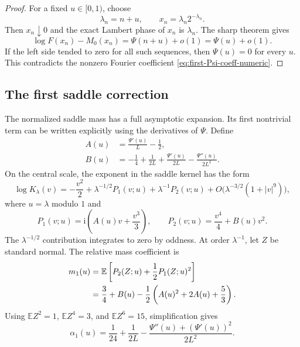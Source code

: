 \documentclass[11pt,oneside]{article}
\theoremstyle{definition}
\theoremstyle{remark}
\newcommand{\ii}{\mathrm i}
\newcommand{\E}{\mathbb E}
\newcommand{\Lam}{\lambda}
\newcommand{\Ltwo}{L}
\newcommand{\PsiPer}{\Psi}
\begin{document}
\begin{proof}
For a fixed $u\in[0,1)$, choose
\begin{equation}\label{eq:phase-subsequence}
  \Lam_n=n+u,
  \qquad x_n=\Lam_n2^{-\Lam_n}.
\end{equation}
Then $x_n\downarrow0$ and the exact Lambert phase of $x_n$ is $\Lam_n$.  The sharp
theorem gives
\[
 \log F(x_n)-M_0(x_n)=\PsiPer(n+u)+o(1)=\PsiPer(u)+o(1).
\]
If the left side tended to zero for all such sequences, then $\PsiPer(u)=0$ for
every $u$.  This contradicts the nonzero Fourier coefficient
\eqref{eq:first-Psi-coeff-numeric}.
\end{proof}

\subsection{The first saddle correction}

The normalized saddle mass has a full asymptotic expansion.  Its first nontrivial
term can be written explicitly using the derivatives of $\PsiPer$.  Define
\begin{align}
 A(u)&=\frac{\PsiPer'(u)}{\Ltwo}-\frac12,
 \label{eq:A-first-correction}\\
 B(u)&=-\frac14+\frac1{2\Ltwo}
 +\frac{\PsiPer'(u)}{2\Ltwo}
 -\frac{\PsiPer''(u)}{2\Ltwo^2}.
 \label{eq:B-first-correction}
\end{align}
On the central scale, the exponent in the saddle kernel has the form
\begin{equation}\label{eq:first-kernel-expansion}
 \log K_\Lam(v)=
 -\frac{v^2}{2}
 +\Lam^{-1/2}P_1(v;u)
 +\Lam^{-1}P_2(v;u)
 +O\bigl(\Lam^{-3/2}(1+|v|^9)\bigr),
\end{equation}
where $u=\Lam$ modulo $1$ and
\begin{equation}\label{eq:P1-P2}
  P_1(v;u)=\ii\left(A(u)v+\frac{v^3}{3}\right),
  \qquad
  P_2(v;u)=\frac{v^4}{4}+B(u)v^2.
\end{equation}
The $\Lam^{-1/2}$ contribution integrates to zero by oddness.  At order
$\Lam^{-1}$, let $Z$ be standard normal.  The relative mass coefficient is
\begin{align}
 m_1(u)
 &=\E\left[P_2(Z;u)+\frac12P_1(Z;u)^2\right]\notag\\
 &=\frac34+B(u)-\frac12\left(A(u)^2+2A(u)+\frac53\right).
 \label{eq:m1-Gaussian}
\end{align}
Using $\E Z^2=1$, $\E Z^4=3$, and $\E Z^6=15$, simplification gives
\begin{equation}\label{eq:alpha1}
 \alpha_1(u)=
 \frac1{24}+\frac1{2\Ltwo}
 -\frac{\PsiPer''(u)+(\PsiPer'(u))^2}{2\Ltwo^2}.
\end{equation}
\end{document}
